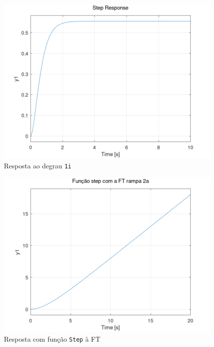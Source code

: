 \documentclass[a4paper,12pt]{article}
\begin{document}
    \begin{figure}[h]
        \centering
        \includegraphics[scale=0.4]{../fig/fig1i.png}
        \caption{Resposta ao degrau \texttt{1i}}
        \label{fig1i}
    \end{figure}
    \begin{figure}[h]
        \centering
        \includegraphics[scale=0.4]{../fig/fig2aStep.png}
        \caption{Resposta com função \texttt{Step} à FT}
        \label{fig2aStep}
    \end{figure}
\end{document}
